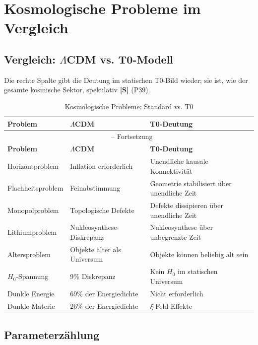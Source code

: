 	\section{Kosmologische Probleme im Vergleich}
	
	\subsection{Vergleich: $\Lambda$CDM vs. T0-Modell}
	
	Die rechte Spalte gibt die Deutung im statischen T0-Bild wieder; sie ist, wie der gesamte kosmische Sektor, spekulativ \textbf{[S]} (P39).
	
	\begin{longtable}{p{4cm}p{4.5cm}p{4.5cm}}
		\caption{Kosmologische Probleme: Standard vs. T0} \\
		\toprule
		\textbf{Problem} & \textbf{$\Lambda$CDM} & \textbf{T0-Deutung} \\
		\midrule
		\endfirsthead
		\multicolumn{3}{c}{\tablename\ \thetable{} -- Fortsetzung} \\
		\toprule
		\textbf{Problem} & \textbf{$\Lambda$CDM} & \textbf{T0-Deutung} \\
		\midrule
		\endhead
		Horizontproblem & Inflation erforderlich & Unendliche kausale Konnektivität \\
		Flachheitsproblem & Feinabstimmung & Geometrie stabilisiert über unendliche Zeit \\
		Monopolproblem & Topologische Defekte & Defekte dissipieren über unendliche Zeit \\
		Lithiumproblem & Nukleosynthese-Diskrepanz & Nukleosynthese über unbegrenzte Zeit \\
		Altersproblem & Objekte älter als Universum & Objekte können beliebig alt sein \\
		$H_0$-Spannung & 9\% Diskrepanz & Kein $H_0$ im statischen Universum \\
		Dunkle Energie & 69\% der Energiedichte & Nicht erforderlich \\
		Dunkle Materie & 26\% der Energiedichte & $\xi$-Feld-Effekte \\
		\bottomrule
	\end{longtable}
	
	\subsection{Parameterzählung}
	
